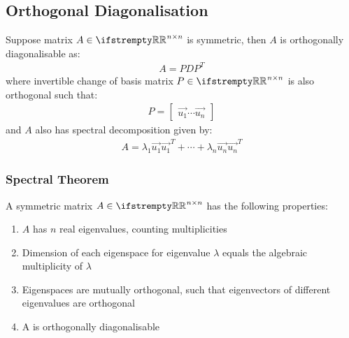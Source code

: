 \documentclass[12pt, a4paper]{article}
\begin{document}
\begin{multicols*}{3}
\subsection{Orthogonal Diagonalisation}
Suppose matrix $A \in \RR^{n{\times}n}$ is symmetric, then $A$ is orthogonally diagonalisable as:
\begin{align*}
  A = PDP^T
\end{align*}
where invertible change of basis matrix $P \in \RR^{n{\times}n}$ is also orthogonal such that:
\begin{align*}
  P = \begin{bmatrix}\vec{u_1} \cdots \vec{u_n}\end{bmatrix}
\end{align*}
and $A$ also has spectral decomposition given by:
\begin{align*}
  A = \lambda_1 \vec{u_1} \vec{u_1}^T + \cdots + \lambda_n \vec{u_n} \vec{u_n}^T
\end{align*}

\subsubsection{Spectral Theorem}
A symmetric matrix $A \in \RR^{n{\times}n}$ has the following properties:
\begin{enumerate}[\roman*.]
  \item $A$ has $n$ real eigenvalues, counting multiplicities
  \item Dimension of each eigenspace for eigenvalue $\lambda$ equals the algebraic multiplicity of $\lambda$
  \item Eigenspaces are mutually orthogonal, such that eigenvectors of different eigenvalues are orthogonal
  \item A is orthogonally diagonalisable
\end{enumerate}

\colbreak


\end{multicols*}
\end{document}
